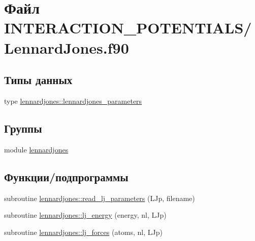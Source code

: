 \hypertarget{_lennard_jones_8f90}{}\section{Файл I\+N\+T\+E\+R\+A\+C\+T\+I\+O\+N\+\_\+\+P\+O\+T\+E\+N\+T\+I\+A\+L\+S/\+Lennard\+Jones.f90}
\label{_lennard_jones_8f90}
\subsection*{Типы данных}
\begin{DoxyCompactItemize}
\item 
type \mbox{\hyperlink{structlennardjones_1_1lennardjones__parameters}{lennardjones\+::lennardjones\+\_\+parameters}}
\end{DoxyCompactItemize}
\subsection*{Группы}
\begin{DoxyCompactItemize}
\item 
module \mbox{\hyperlink{namespacelennardjones}{lennardjones}}
\end{DoxyCompactItemize}
\subsection*{Функции/подпрограммы}
\begin{DoxyCompactItemize}
\item 
subroutine \mbox{\hyperlink{namespacelennardjones_ace8630f2bebc2a2aac8ab12a64aedffa}{lennardjones\+::read\+\_\+lj\+\_\+parameters}} (L\+Jp, filename)
\item 
subroutine \mbox{\hyperlink{namespacelennardjones_af8b565355907ac9a41a6336acd884a37}{lennardjones\+::lj\+\_\+energy}} (energy, nl, L\+Jp)
\item 
subroutine \mbox{\hyperlink{namespacelennardjones_af88358c174f20878507192477e6b8dde}{lennardjones\+::lj\+\_\+forces}} (atoms, nl, L\+Jp)
\end{DoxyCompactItemize}
